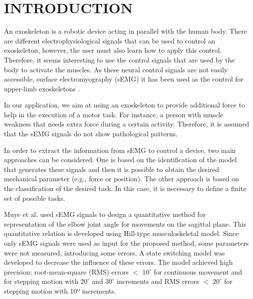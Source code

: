 \documentclass[letterpaper, 10 pt, conference]{ieeeconf}  %
\begin{document}
\section{INTRODUCTION}
An exoskeleton is a robotic device acting in parallel with the human body. There are different electrophysiological signals that can be used to control an exoskeleton, however, the user must also learn how to apply this control. Therefore, it seems interesting to use the control signals that are used by the body to activate the muscles. As these neural control signals are not easily accessible, surface electromyography (sEMG) it has been used  as the control for upper-limb exoskeletons \cite{Tang7332977,Lenzi2012} . 
% 
% 




In our application, we aim at using an exoskeleton to provide additional force to help in the execution of a motor task. For instance, a person with muscle weakness that needs extra force during a certain activity. Therefore, it is assumed that the sEMG signals do not show pathological patterns.

In order to extract the information from sEMG to control a device, two main approaches can be considered. One is based on the identification of the model that generates these signals and then it is possible to obtain the desired mechanical parameter (e.g., force or position). The other approach is based on the classification of the desired task. In this case, it is necessary to define a finite set of possible tasks.  \cite{Fougner2012663}\cite{Fougner2011644}

Muye et al. \cite{Pang2015165} used sEMG signals to design a quantitative method for representation of the elbow joint angle for movements on the sagittal plane. This quantitative relation is developed using Hill-type musculoskeletal model. Since only sEMG signals were used as input for the proposed method, some parameters were not measured, introducing some errors. A state switching model was developed to decrease the influence of these errors. The model achieved high precision: root-mean-square (RMS) errors \(<\) \(10^{\circ}\) for continuous movement and for stepping motion with \(20^{\circ}\) and \(30^{\circ}\) increments and RMS errors \(<\) \(20^{\circ}\) for stepping motion with 10º increments. 
% 
% 
\end{document}
